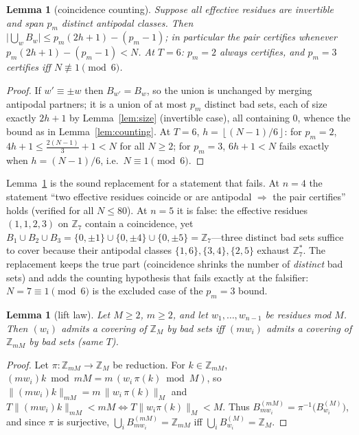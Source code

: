 \documentclass[11pt,a4paper]{article}
\numberwithin{equation}{section}
\theoremstyle{plain}
\newtheorem{lemma}[theorem]{Lemma}
\theoremstyle{definition}
\theoremstyle{remark}
\newcommand{\Z}{\mathbb{Z}}
\newcommand{\floor}[1]{\left\lfloor #1 \right\rfloor}
\begin{document}
\begin{lemma}[coincidence counting]\label{lem:D3}
Suppose all effective residues are invertible and span $p_m$ distinct
antipodal classes. Then
$\bigl|\bigcup_w B_w\bigr|\le p_m(2h+1)-(p_m-1)$; in particular the pair
certifies whenever $p_m(2h+1)-(p_m-1)<N$. At $T=6$: $p_m=2$ always
certifies, and $p_m=3$ certifies iff $N\not\equiv 1\pmod 6$.
\end{lemma}

\begin{proof}
If $w'\equiv\pm w$ then $B_{w'}=B_w$, so the union is unchanged by merging
antipodal partners; it is a union of at most $p_m$ distinct bad sets, each
of size exactly $2h+1$ by Lemma~\ref{lem:size} (invertible case), all
containing $0$, whence the bound as in Lemma~\ref{lem:counting}. At $T=6$,
$h=\floor{(N-1)/6}$: for $p_m=2$,
$4h+1\le\tfrac{2(N-1)}{3}+1<N$ for all $N\ge 2$; for $p_m=3$,
$6h+1<N$ fails exactly when $h=(N-1)/6$, i.e.\ $N\equiv1\pmod 6$.
\end{proof}

Lemma~\ref{lem:D3} is the sound replacement for a statement that fails.
At $n=4$ the statement ``two effective
residues coincide or are antipodal $\Rightarrow$ the pair certifies'' holds
(verified for all $N\le 80$). At $n=5$ it is false: the effective residues
$(1,1,2,3)$ on $\Z_7$ contain a coincidence, yet
$B_1\cup B_2\cup B_3=\{0,\pm1\}\cup\{0,\pm4\}\cup\{0,\pm5\}=\Z_7$---three
distinct bad sets suffice to cover because their antipodal classes
$\{1,6\},\{3,4\},\{2,5\}$ exhaust $\Z_7^\ast$. The replacement keeps the
true part (coincidence shrinks the number of \emph{distinct} bad sets) and
adds the counting hypothesis that fails exactly at the falsifier:
$N=7\equiv 1 \pmod 6$ is the excluded case of the $p_m=3$ bound.

\begin{lemma}[lift law]\label{lem:lift}
Let $M\ge 2$, $m\ge 2$, and let $w_1,\dots,w_{n-1}$ be residues mod $M$.
Then $(w_i)$ admits a covering of $\Z_M$ by bad sets iff
$(mw_i)$ admits a covering of $\Z_{mM}$ by bad sets (same $T$).
\end{lemma}

\begin{proof}
Let $\pi:\Z_{mM}\to\Z_M$ be reduction. For $k\in\Z_{mM}$,
$(mw_i)k\bmod mM=m\,(w_i\,\pi(k)\bmod M)$, so
$\lVert (mw_i)k\rVert_{mM}=m\,\lVert w_i\,\pi(k)\rVert_{M}$ and
$T\lVert (mw_i)k\rVert_{mM}<mM\iff T\lVert w_i\pi(k)\rVert_{M}<M$. Thus
$B^{(mM)}_{mw_i}=\pi^{-1}\bigl(B^{(M)}_{w_i}\bigr)$, and since $\pi$ is
surjective, $\bigcup_i B^{(mM)}_{mw_i}=\Z_{mM}$ iff
$\bigcup_i B^{(M)}_{w_i}=\Z_M$.
\end{proof}
\end{document}
